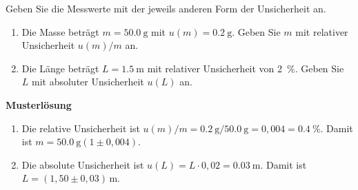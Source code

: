 \begin{ExerciseBlock}
Geben Sie die Messwerte mit der jeweils anderen Form der Unsicherheit an.
\begin{enumerate}
\item Die Masse beträgt $m=\qty{50.0}{\gram}$ mit $u(m)=\qty{0.2}{\gram}$. Geben Sie $m$ mit relativer Unsicherheit $u(m)/m$ an.
\item Die Länge beträgt $L=\qty{1.5}{\metre}$ mit relativer Unsicherheit von \qty{2}{\percent}. Geben Sie $L$ mit absoluter Unsicherheit $u(L)$ an.
\end{enumerate}
\end{ExerciseBlock}
\begin{Solution}
\par\medskip\noindent\textbf{Musterlösung}\par\nopagebreak[4]
\begin{enumerate}
\item Die relative Unsicherheit ist $u(m)/m=\qty{0.2}{\gram}/\qty{50.0}{\gram}=0{,}004=\qty{0.4}{\percent}$. Damit ist $m=\qty{50.0}{\gram}(1\pm0{,}004)$.
\item Die absolute Unsicherheit ist $u(L)=L\cdot0{,}02=\qty{0.03}{\metre}$. Damit ist $L=(1{,}50\pm0{,}03)\,\unit{\metre}$.
\end{enumerate}
\end{Solution}
